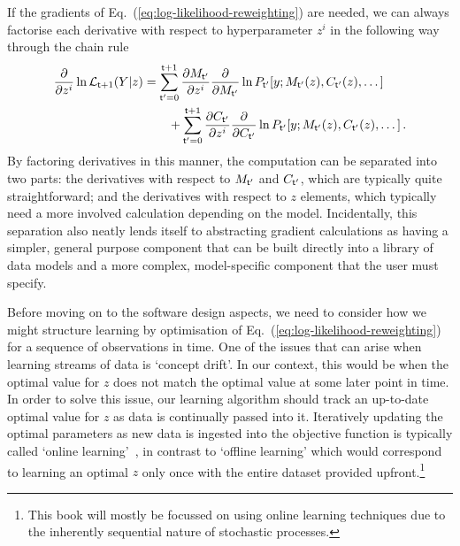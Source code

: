 If the gradients of Eq.~(\ref{eq:log-likelihood-reweighting}) are needed, we can always factorise each derivative with respect to hyperparameter $z^i$ in the following way through the chain rule
\begin{align}
\frac{\partial}{\partial z^i}\ln {\cal L}_{{\sf t}+1}(Y \vert z) &= \sum_{{\sf t}'=0}^{{\sf t}+1}\frac{\partial M_{{\sf t}'}}{\partial z^i}\frac{\partial}{\partial M_{{\sf t}'}}\ln P_{{\sf t}'}[y;M_{{\sf t}'}(z),C_{{\sf t}'}(z),\dots ] \nonumber \\
&\qquad + \sum_{{\sf t}'=0}^{{\sf t}+1}\frac{\partial C_{{\sf t}'}}{\partial z^i}\frac{\partial }{\partial C_{{\sf t}'}}\ln P_{{\sf t}'}[y;M_{{\sf t}'}(z),C_{{\sf t}'}(z),\dots ] \,. \label{eq:log-likelihood-reweighting-grad}
\end{align}
By factoring derivatives in this manner, the computation can be separated into two parts: the derivatives with respect to $M_{{\sf t}'}$ and $C_{{\sf t}'}$, which are typically quite straightforward; and the derivatives with respect to $z$ elements, which typically need a more involved calculation depending on the model. Incidentally, this separation also neatly lends itself to abstracting gradient calculations as having a simpler, general purpose component that can be built directly into a library of data models and a more complex, model-specific component that the user must specify.

Before moving on to the software design aspects, we need to consider how we might structure learning by optimisation of Eq.~(\ref{eq:log-likelihood-reweighting}) for a sequence of observations in time. One of the issues that can arise when learning streams of data is `concept drift'. In our context, this would be when the optimal value for $z$ does not match the optimal value at some later point in time. In order to solve this issue, our learning algorithm should track an up-to-date optimal value for $z$ as data is continually passed into it. Iteratively updating the optimal parameters as new data is ingested into the objective function is typically called `online learning'~\cite{hazan2016introduction,sutton2018reinforcement}, in contrast to `offline learning' which would correspond to learning an optimal $z$ only once with the entire dataset provided upfront.\footnote{This book will mostly be focussed on using online learning techniques due to the inherently sequential nature of stochastic processes.}

    